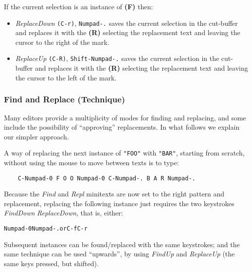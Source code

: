 \documentclass[11pt,a4paper]{article}
\begin{document}
If the current selection is an instance of \textbf{(F)} then:

\begin{itemize}
\item
  \emph{ReplaceDown} \texttt{(C-r)}, \texttt{Numpad-.} saves the current
  selection in the cut-buffer and replaces it with the \textbf{(R)}
  selecting the replacement text and leaving the cursor to the right of
  the mark.
\item
  \emph{ReplaceUp} \texttt{(C-R)}, \texttt{Shift-Numpad-.} saves the
  current selection in the cut-buffer and replaces it with the
  \textbf{(R)} selecting the replacement text and leaving the cursor to
  the left of the mark.
\end{itemize}

\hypertarget{find-and-replace-technique}{%
\subsubsection{Find and Replace
(Technique)}\label{find-and-replace-technique}}

Many editors provide a multiplicity of modes for finding and replacing,
and some include the possibility of ``approving'' replacements. In what
follows we explain our simpler approach.

A way of replacing the next instance of \texttt{"FOO"} with
\texttt{"BAR"}, starting from scratch, without using the mouse to
move between texts is to type:

\begin{verbatim}
    C-Numpad-0 F O O Numpad-0 C-Numpad-. B A R Numpad-.
\end{verbatim}

Because the \emph{Find} and \emph{Repl} minitexts are now set
to the right pattern and replacement, replacing the following
instance just requires the two keystrokes \emph{FindDown} \emph{ReplaceDown},
that is, either:
\begin{alltt}
    Numpad-0 Numpad-.      \textrm{or}         C-f C-r
\end{alltt}

Subsequent instances can be found/replaced with the same keystrokes;
and the same technique can be used ``upwards'', by using \emph{FindUp}
and \emph{ReplaceUp} (the same keys pressed, but shifted).
\end{document}
